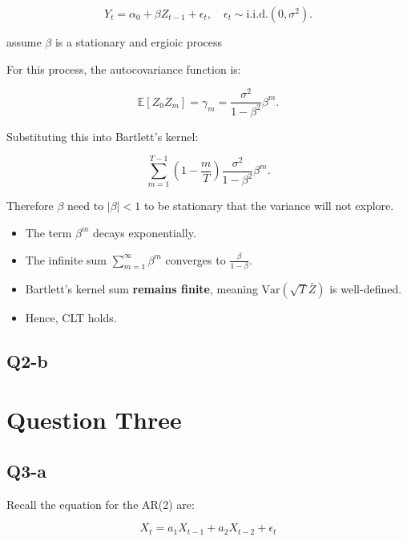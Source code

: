 \documentclass{article} %
\begin{document}
\begin{equation}
    Y_t = \alpha_0 +  \beta Z_{t-1} + \epsilon_t, \quad \epsilon_t \sim \text{i.i.d.} (0, \sigma^2).
\end{equation}

assume $\beta $ is a stationary and ergioic process 


For this process, the autocovariance function is:

\begin{equation}
    \mathbb{E}[Z_0 Z_m] = \gamma_m = \frac{\sigma^2}{1 - \beta^2} \beta^m.
\end{equation}

Substituting this into Bartlett’s kernel:

\begin{equation}
    \sum_{m=1}^{T-1} \left( 1 - \frac{m}{T} \right) \frac{\sigma^2}{1 - \beta^2} \beta^m.
\end{equation}


Therefore  $\beta$ need to  $|\beta| < 1$ to be stationary that the variance will not explore.

\begin{itemize}
    \item The term $\beta^m$ decays exponentially.
    \item The infinite sum $\sum_{m=1}^{\infty} \beta^m$ converges to $\frac{\beta}{1 - \beta}$.
    \item Bartlett’s kernel sum \textbf{remains finite}, meaning $\text{Var}(\sqrt{T} \bar{Z})$ is well-defined.
    \item Hence, CLT holds.
\end{itemize}


\subsection{Q2-b}



\section*{Question Three}
\subsection{Q3-a}

Recall the equation for the AR(2) are: 

\begin{equation}
 X_t = a_1 X_{t-1} + a_2 X_{t-2} + \epsilon_t
\end{equation}
\end{document}
